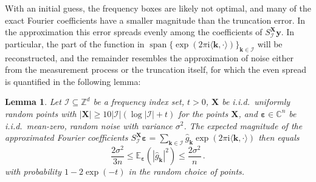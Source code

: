 \documentclass[a4paper]{scrartcl}
\numberwithin{equation}{section}
\newtheorem{lemma}[theorem]{Lemma}
\DeclareMathOperator{\Span}{span}
\begin{document}
With an initial guess, the frequency boxes are likely not optimal, and many of the exact Fourier coefficients have a smaller magnitude than the truncation error.
In the approximation this error spreads evenly among the coefficients of $S_{\mathcal I}^{\bm X}\bm y$.
In particular, the part of the function in $\Span\{\exp(2\pi\mathrm i\langle\bm k,\cdot\rangle)\}_{\bm k\in\mathcal I}$ will be reconstructed, and the remainder resembles the approximation of noise either from the measurement process or the truncation itself, for which the even spread is quantified in the following lemma:

\begin{lemma} Let $\mathcal I\subseteq\mathds Z^d$ be a frequency index set, $t>0$, $\bm X$ be i.i.d.\ uniformly random points with $|\bm X|\ge 10|\mathcal I|(\log|\mathcal I| + t)$ for the points $\bm X$, and $\bm\varepsilon\in\mathds C^n$ be i.i.d.\ mean-zero, random noise with variance $\sigma^2$.
    The expected magnitude of the approximated Fourier coefficients $S_{\mathcal I}^{\bm X}\bm\varepsilon = \sum_{\bm k\in\mathcal I} \hat g_{\bm k}\exp(2\pi\mathrm i\langle\bm k,\cdot\rangle)$ then equals
    \begin{equation*}
        \frac{2\sigma^2}{3n}
        \le
        \mathds E_{\bm\varepsilon}(|\hat g_{\bm k}|^2)
        \le
        \frac{2\sigma^2}{n} \,.
    \end{equation*}
    with probability $1-2\exp(-t)$ in the random choice of points.
\end{lemma} 
\end{document}
